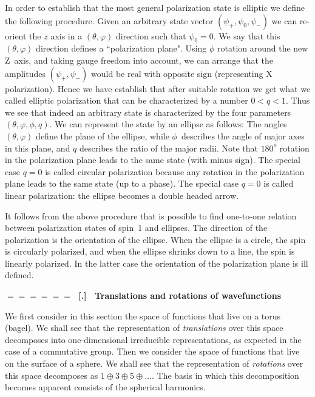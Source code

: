 \documentclass[onecolumn,fleqn]{revtex4}
\renewcommand{\thesubsection}{\arabic{subsection}}
\renewcommand{\thesubsubsection}{\arabic{subsubsection}}
\newcommand{\sheadC}[1]
{
\addtocounter{subsubsection}{1}
\vspace{5mm}
{\Large\bf $=\!=\!=\!=\!=\!=\;$ [\thesubsection.\thesubsubsection] \ #1}  
\nopagebreak
\phantomsection
}
\begin{document}
In order to establish that the most general polarization
state is elliptic we define the following procedure.  
Given an arbitrary state vector 
${(\psi_{+},\psi_0,\psi_{-})}$ we can re-orient 
the $z$ axis in a $(\theta,\varphi)$ direction 
such that $\psi_0=0$. 
We say that this $(\theta,\varphi)$ direction 
defines a ``polarization plane".
Using $\phi$ rotation around the new Z~axis, 
and taking gauge freedom into account, 
we can arrange that the amplitudes  ${(\psi_{+},\psi_{-})}$  
would be real with opposite sign (representing X polarization).
Hence we have establish that after suitable  
rotation we get what we called elliptic polarization
that can be characterized by a number ${0<q<1}$. 
Thus we see that indeed an arbitrary state 
is characterized by the four parameters ${(\theta,\varphi,\phi,q)}$. 
We can represent the state by an ellipse as follows: 
The angles $(\theta,\varphi)$ define the plane of the ellipse, 
while $\phi$~describes the angle of major axes in this plane, 
and $q$ describes the ratio of the major radii.  
Note that ${180^o}$ rotation in the polarization plane 
leads to the same state (with minus sign). 
The special case ${q=0}$ is called circular polarization 
because any rotation in the polarization plane leads to the 
same state (up to a phase). The special case ${q=0}$ 
is called linear polarization: the ellipse becomes a double headed arrow. 


It follows from the above procedure that is possible 
to find one-to-one relation between polarization states 
of spin~1 and ellipses. 
The direction of the polarization is the orientation 
of the ellipse. When the ellipse is a circle, the spin  
is circularly polarized, and when the ellipse shrinks down 
to a line, the spin is linearly polarized.  
In the latter case the orientation of the polarization plane is ill defined.


\newpage
\sheadC{Translations and rotations of wavefunctions}

We first consider in this section 
the space of functions that live on a torus (bagel).  
We shall see that the representation of {\em translations} 
over this space decomposes 
into one-dimensional irreducible representations,  
as expected in the case of a commutative group.
Then we consider the space of functions that live 
on the surface of a sphere. We shall see that 
the representation of {\em rotations} 
over this space decomposes as ${1 \oplus 3 \oplus 5 \oplus  \dots}$.
The basis in which this decomposition becomes 
apparent consists of the spherical harmonics.   
\end{document}
